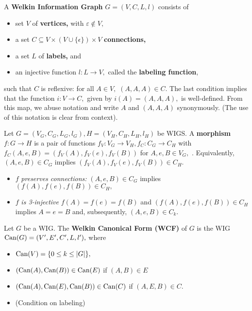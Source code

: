 \begin{definition} A \textbf{Welkin Information Graph} $G = (V, C, L, l)$ consists of
  \begin{itemize}
    \item set $V$ of \textbf{vertices,} with $\varepsilon \not \in V,$
    \item a set $C \subseteq V \times (V \cup \{\epsilon\}) \times V$ \textbf{connections,}
    \item a set $L$ of \textbf{labels,} and
    \item an injective function $l: L \to V,$ called the \textbf{labeling function},
  \end{itemize}
  such that $C$ is reflexive: for all $A \in V,$ $(A, A, A) \in C.$
  The last condition implies that the function $i: V \to C,$ given by $i(A) = (A, A, A),$ is well-defined. From this map, we abuse notation and write $A$ and $(A, A, A)$ synonymously. (The use of this notation is clear from context). \end{definition}

\begin{definition}
  Let $G = (V_{G}, C_{G}, L_{G}, l_{G}), H = (V_{H}, C_{H}, L_{H}, l_{H})$ be WIGS. A \textbf{morphism} $f: G \to H$ is a pair of functions $f_{V}: V_{G} \to V_{H}, f_{C}: C_{G} \to C_{H}$ with $f_{C}(A, e, B) = (f_{V}(A), f_{V}(e), f_{V}(B))$ for $A, e, B \in V_{G},$ . Equivalently, $(A, e, B) \in C_{G}$ implies $(f_{V}(A), f_{V}(e), f_{V}(B)) \in C_{H}.$
  \begin{itemize}
    \item $f$ \textit{preserves connections:} $(A, e, B) \in C_{G}$ implies $(f(A), f(e), f(B)) \in C_{H},$
    \item $f$ \textit{is 3-injective} $f(A) = f(e) = f(B)$ and $(f(A), f(e),f(B)) \in C_{H}$ implies $A = e = B$ and, subsequently, $(A, e, B) \in C_{k}.$
  \end{itemize}


\end{definition}



\begin{definition}
  Let $G$ be a WIG. The \textbf{Welkin Canonical Form (WCF)} of $G$ is the WIG $\textrm{Can}(G) = (V', E', C', L, l'),$
  where
  \begin{itemize}
    \item $\textrm{Can}(V) = \{0 \leq k \leq |G|\},$
    \item $(\textrm{Can}(A), \textrm{Can}(B)) \in \textrm{Can}(E)$ if $(A, B) \in E$
    \item $(\textrm{Can}(A), \textrm{Can}(E), \textrm{Can}(B)) \in \textrm{Can}(C)$ if $(A, E, B) \in C.$
    \item (Condition on labeling)
  \end{itemize}


\end{definition}

